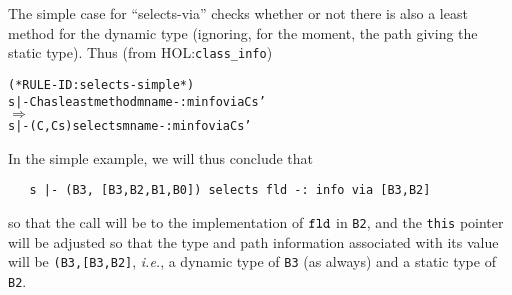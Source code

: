 \documentclass[11pt]{article}
\newcommand{\ie}{\emph{i.e.}}
\newcommand{\HOLfile}[1]{HOL:\texttt{#1}}
\begin{document}
The simple case for ``selects-via'' checks whether or not there is
also a least method for the dynamic type (ignoring, for the moment,
the path giving the static type).  Thus (from \HOLfile{class_info})
\begin{center}
\begin{minipage}{\textwidth}
\begin{alltt}
(* RULE-ID: selects-simple *)
     s |- C has least method mname -: minfo via Cs'
   \(\Rightarrow\)
     s |- (C,Cs) selects mname -: minfo via Cs'
\end{alltt}
\end{minipage}
\end{center}
In the simple example, we will thus conclude that
\begin{verbatim}
   s |- (B3, [B3,B2,B1,B0]) selects fld -: info via [B3,B2]
\end{verbatim}
so that the call will be to the implementation of $\texttt{fld}$ in
\texttt{B2}, and the \texttt{this} pointer will be adjusted so that
the type and path information associated with its value will be
\texttt{(B3,[B3,B2]}, \ie, a dynamic type of \texttt{B3} (as always)
and a static type of \texttt{B2}.
\end{document}
